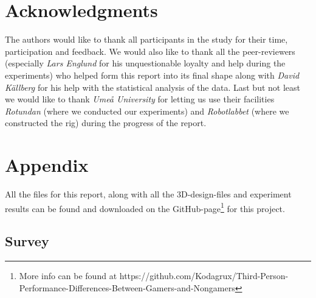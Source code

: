 \documentclass[runningheads,a4paper,oribibl]{llncs}
\begin{document}
\section{Acknowledgments}
The authors would like to thank all participants in the study for their time, participation and feedback. We would also like to thank all the peer-reviewers (especially \emph{Lars Englund} for his unquestionable loyalty and help during the experiments) who helped form this report into its final shape along with \emph{David Källberg} for his help with the statistical analysis of the data. Last but not least we would like to thank \emph{Umeå University} for letting us use their facilities \emph{Rotundan} (where we conducted our experiments) and \emph{Robotlabbet} (where we constructed the rig) during the progress of the report.








%



\appendix

\section{Appendix}
All the files for this report, along with all the 3D-design-files and experiment results can be found and downloaded on the GitHub-page\footnote{More info can be found at https://github.com/Kodagrux/Third-Person-Performance-Differences-Between-Gamers-and-Nongamers} for this project.
\subsection{Survey} \label{subsec:Survey}

\end{document}
